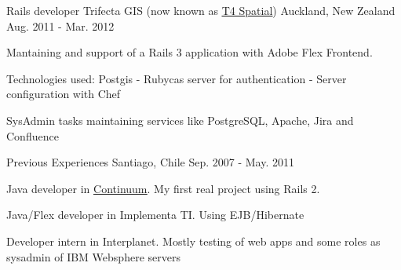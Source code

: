 \begin{cventries}
  \cventry
    {Rails developer} %
    {Trifecta GIS (now known as {\href{http://www.t4spatial.com/}{\underline{T4 Spatial}}})} %
    {Auckland, New Zealand} %
    {Aug. 2011 - Mar. 2012} %
    {
      \begin{cvitems} %
        \item { Mantaining and support of a Rails 3 application with Adobe Flex Frontend.}
        \item { Technologies used: Postgis - Rubycas server for authentication - Server configuration with Chef }
        \item { SysAdmin tasks maintaining services like PostgreSQL, Apache, Jira and Confluence}
      \end{cvitems}
    }

  \cventry
    {} %
    {Previous Experiences} %
    {Santiago, Chile} %
    {Sep. 2007 - May. 2011} %
    {
      \begin{cvitems} %
        \item { Java developer in \href{http://www.continuumhq.co/}{\underline{Continuum}}. My first real project using Rails 2. }
        \item { Java/Flex developer in Implementa TI. Using EJB/Hibernate }
        \item { Developer intern in Interplanet. Mostly testing of web apps and some roles as sysadmin of IBM Websphere servers }
      \end{cvitems}
    }

\end{cventries}
